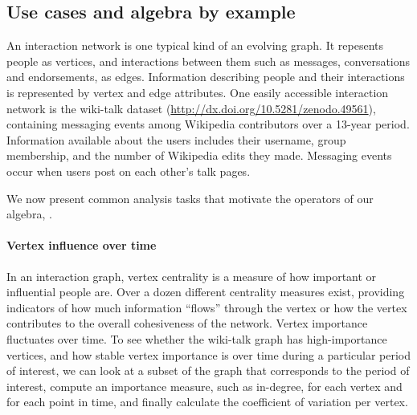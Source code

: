 \subsection{Use cases and algebra by example}
\label{sec:cases}

An interaction network is one typical kind of an evolving graph.  It
repesents people as vertices, and interactions between them such as
messages, conversations and endorsements, as edges.  Information
describing people and their interactions is represented by vertex and
edge attributes.  One easily accessible interaction network is the
wiki-talk dataset (\url{http://dx.doi.org/10.5281/zenodo.49561}),
containing messaging events among Wikipedia contributors over a
13-year period.  Information available about the users includes their
username, group membership, and the number of Wikipedia edits they
made.  Messaging events occur when users post on each other's talk
pages.

We now present common analysis tasks that motivate the operators of
our algebra, \tga. 

\paragraph*{Vertex influence over time}
In an interaction graph, vertex centrality is a measure of how
important or influential people are.  Over a dozen different
centrality measures exist, providing indicators of how much
information ``flows'' through the vertex or how the vertex contributes
to the overall cohesiveness of the network.  Vertex importance
fluctuates over time.  To see whether the wiki-talk graph has
high-importance vertices, and how stable vertex importance is over
time during a particular period of interest, we can look at a subset
of the graph that corresponds to the period of interest, compute an
importance measure, such as in-degree, for each vertex and for each
point in time, and finally calculate the coefficient of variation per
vertex.


